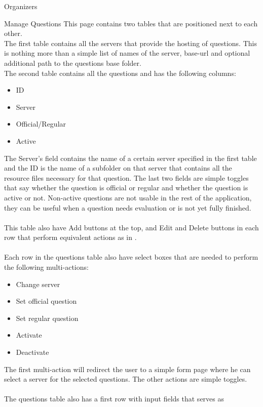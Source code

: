 \begin{section}{Organizers}
	\begin{subsection}{Manage Questions}
		This page contains two tables that are positioned next to each other. \\
		The first table contains all the servers that provide the hosting of questions.
		This is nothing more than a simple list of names of the server, base-url and
		optional additional path to the questions base folder. \\
		The second table contains all the questions and has the following columns:
		\begin{itemize}
			\item ID
			\item Server
			\item Official/Regular
			\item Active
		\end{itemize}
		The Server's field contains the name of a certain server specified in the first
		table and the ID is the name of a subfolder on that server that contains all the
		resource files necessary for that question.
		The last two fields are simple toggles that say whether the question is official
		or regular and whether the question is active or not. Non-active questions are
		not usable in the rest of the application, they can be useful when a question
		needs evaluation or is not yet fully finished. \\
		\\
		This table also have Add buttons at the top, and Edit and Delete buttons in each
		row that perform equivalent actions as in .
		\\
		\\
		Each row in the questions table also have select boxes that are needed to perform
		the following multi-actions:
		\begin{itemize}
			\item Change server
			\item Set official question
			\item Set regular question
			\item Activate
			\item Deactivate
		\end{itemize}
		The first multi-action will redirect the user to a simple form page where he can
		select a server for the selected questions. The other actions are simple
		toggles.\\
		\\
		The questions table also has a first row with input fields that serves as

\end{subsection}
\end{section}
